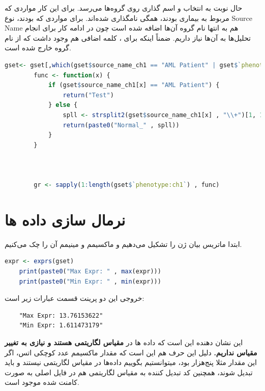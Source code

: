 \documentclass[12pt]{article}
\begin{document}
حال نوبت به انتخاب و اسم گذاری روی گروه‌ها می‌رسد. برای این کار مواردی که مربوط به بیماری بودند، همگی  نامگذاری شده‌اند. برای مواردی که  بودند، نوع Source Name هم به انتها نام گروه آن‌ها اضافه شده است چون در ادامه کار برای انجام تحلیل‌ها به آن‌ها نیاز داریم. ضمناً اینکه برای ، کلمه اضافی  هم وجود داشت که از نام گروه خارج شده است.

\begin{latin}
	\begin{lstlisting}[language=R]
		gset<- gset[,which(gset$source_name_ch1 == "AML Patient" | gset$`phenotype:ch1` == "Normal")]
		func <- function(x) {
			if (gset$source_name_ch1[x] == "AML Patient") {
				return("Test")
			} else {
				spll <- strsplit2(gset$source_name_ch1[x] , "\\+")[1, 1]
				return(paste0("Normal_" , spll))
			}
		}
		
		
		
		gr <- sapply(1:length(gset$`phenotype:ch1`) , func)
\end{lstlisting}
\end{latin}

 
 
\section{نرمال سازی داده ها}

ابتدا ماتریس بیان ژن را تشکیل می‌دهیم و ماکسیمم و مینیمم آن را چک می‌کنیم.



\begin{latin}
	\begin{lstlisting}[language=R]
	expr <- exprs(gset)
	print(paste0("Max Expr: " , max(expr)))
	print(paste0("Min Expr: " , min(expr)))
	\end{lstlisting}
\end{latin}

خروجی این دو پرینت قسمت عبارات زیر است:
\begin{latin}
\begin{verbatim}
	"Max Expr: 13.76153622"
	"Min Expr: 1.611473179"
\end{verbatim}
\end{latin}


این نشان دهنده این است که داده ها در \textbf{مقیاس لگاریتمی هستند و نیازی به تغییر مقیاس نداریم.}
دلیل این حرف هم این است که مقدار ماکسیمم عدد کوچکی اتس، اگر این مقدار مثلا پنج‌هزار بود، میتوانستیم بگوییم داده‌ها در مقیاس لگاریتمی نیستند و باید تبدیل شوند، همچنین
کد تبدیل کننده به مقیاس لگاریتمی هم در فایل اصلی به صورت کامنت شده موجود است.
\end{document}
